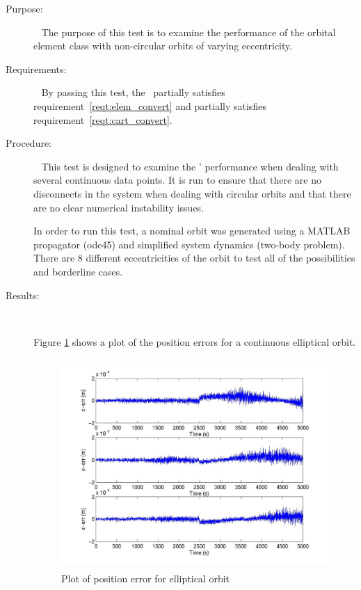 \label{test:ecc_cont_orb}
\begin{description}
\item[Purpose:] \ \newline
The purpose of this test is to examine the performance of the orbital element
class with non-circular orbits of varying eccentricity.
\item[Requirements:] \ \newline
By passing this test, the \OrbitalElement\ partially satisfies
requirement~\ref{reqt:elem_convert} and partially satisfies
requirement~\ref{reqt:cart_convert}.
\item[Procedure:]\ \newline
This test is designed to examine the \OrbitalElement' performance when
dealing with several continuous data points.  It is run to ensure that there
are no disconnects in the system when dealing with circular orbits and that
there are no clear numerical instability issues.

In order to run this test, a nominal orbit was generated using a MATLAB
propagator (ode45) and simplified system dynamics (two-body problem).  There
are 8 different eccentricities of the orbit to test all of the possibilities
and borderline cases.

\item[Results:]\ \newline

Figure \ref{ell_cont_pos} shows a plot of the position errors for a continuous
elliptical orbit.

\begin{figure}[h]
\begin{center}
\includegraphics[height=80mm]{JPGfiles/pos_err_ell.jpg}
\caption{Plot of position error for elliptical orbit}
\label{ell_cont_pos}
\end{center}
\end{figure}


\end{description}
